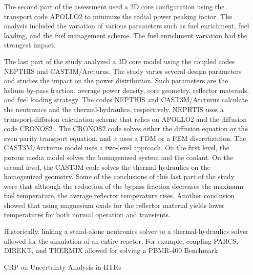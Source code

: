 \documentclass[11pt,letterpaper]{article}
\begin{document}
The second part of the assessment used a 2D core configuration using the transport code APOLLO2 \cite{sanchez_apollo2_1999} to minimize the radial power peaking factor.
The analysis included the variation of various parameters such as fuel enrichment, fuel loading, and the fuel management scheme.
The fuel enrichment variation had the strongest impact.

The last part of the study analyzed a 3D core model using the coupled codes NEPTHIS \cite{cavalier_presentation_2005} and CAST3M/Arcturus.
The study varies several design parameters and studies the impact on the power distribution.
Such parameters are the helium by-pass fraction, average power density, core geometry, reflector materials, and fuel loading strategy.
The codes NEPTHIS and CAST3M/Arcturus calculate the neutronics and the thermal-hydraulics, respectively.
NEPHTIS uses a transport-diffusion calculation scheme that relies on APOLLO2 and the diffusion code CRONOS2 \cite{lautard_cronos_1990}.
The CRONOS2 code solves either the diffusion equation or the even parity transport equation, and it uses a \gls{FDM} or a \gls{FEM} discretization.
The CAST3M/Arcturus model uses a two-level approach.
On the first level, the porous media model solves the homogenized system and the coolant.
On the second level, the CAST3M code solves the thermal-hydraulics on the homogenized geometry.
Some of the conclusions of this last part of the study were that although the reduction of the bypass fraction decreases the maximum fuel temperature, the average reflector temperature rises.
Another conclusion showed that using magnesium oxide for the reflector material yields lower temperatures for both normal operation and transients.












Historically, linking a stand-alone neutronics solver to a thermal-hydraulics solver allowed for the simulation of an entire reactor.
For example, coupling PARCS, DIREKT, and THERMIX \cite{seker_analysis_2006} allowed for solving a \gls{PBMR}-400 Benchmark \cite{reitsma_oecdneansc_2006}.

CRP on Uncertainty Analysis in HTRs %
\cite{gougar_htgr_2016}

\pagebreak


\end{document}
